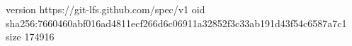 version https://git-lfs.github.com/spec/v1
oid sha256:7660460abf016ad4811ecf266d6c06911a32852f3c33ab191d43f54c6587a7c1
size 174916
